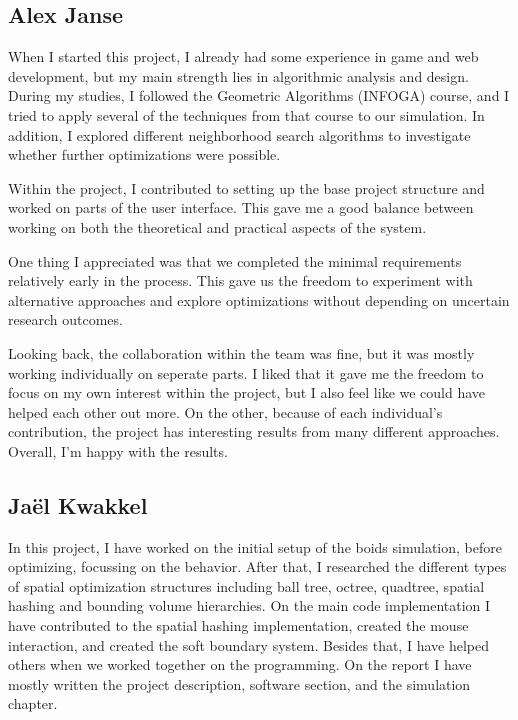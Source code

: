\documentclass[a4paper, 12pt]{article}
\begin{document}
\subsection*{Alex Janse}

When I started this project, I already had some experience in game and web development, but my main
strength lies in algorithmic analysis and design. During my studies, I followed the Geometric Algorithms
(INFOGA) course, and I tried to apply several of the techniques from that course to our simulation.
In addition, I explored different neighborhood search algorithms to investigate whether further
optimizations were possible.

Within the project, I contributed to setting up the base project structure and worked on parts of the
user interface. This gave me a good balance between working on both the theoretical and practical
aspects of the system.

One thing I appreciated was that we completed the minimal requirements relatively early in the process.
This gave us the freedom to experiment with alternative approaches and explore optimizations without
depending on uncertain research outcomes.

Looking back, the collaboration within the team was fine, but it was mostly working individually on
seperate parts. I liked that it gave me the freedom to focus on my own interest within the project,
but I also feel like we could have helped each other out more. On the other, because of each individual's
contribution, the project has interesting results from many different approaches. Overall, I'm happy
with the results.

\subsection*{Jaël Kwakkel}

In this project, I have worked on the initial setup of the boids simulation,
before optimizing, focussing on the behavior. After that, I researched the
different types of spatial optimization structures including ball tree, octree,
quadtree, spatial hashing and bounding volume hierarchies. On the main code
implementation I have contributed to the spatial hashing implementation,
created the mouse interaction, and created the soft boundary system. Besides
that, I have helped others when we worked together on the programming. On the
report I have mostly written the project description, software section, and the
simulation chapter.
\end{document}
